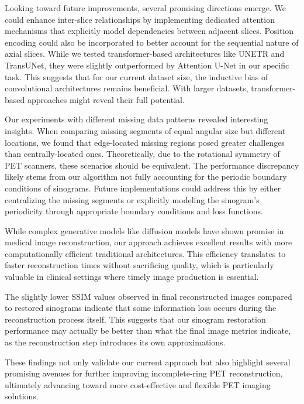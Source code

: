 \documentclass[
reprint,
superscriptaddress,
nofootinbib,
amsmath,amssymb,
aps,
prd,
]{revtex4-2}
\begin{document}
Looking toward future improvements, several promising directions emerge. We could enhance inter-slice relationships by implementing dedicated attention mechanisms that explicitly model dependencies between adjacent slices. Position encoding could also be incorporated to better account for the sequential nature of axial slices. While we tested transformer-based architectures like UNETR and TransUNet, they were slightly outperformed by Attention U-Net in our specific task. This suggests that for our current dataset size, the inductive bias of convolutional architectures remains beneficial. With larger datasets, transformer-based approaches might reveal their full potential.

Our experiments with different missing data patterns revealed interesting insights. When comparing missing segments of equal angular size but different locations, we found that edge-located missing regions posed greater challenges than centrally-located ones. Theoretically, due to the rotational symmetry of PET scanners, these scenarios should be equivalent. The performance discrepancy likely stems from our algorithm not fully accounting for the periodic boundary conditions of sinograms. Future implementations could address this by either centralizing the missing segments or explicitly modeling the sinogram's periodicity through appropriate boundary conditions and loss functions.

While complex generative models like diffusion models have shown promise in medical image reconstruction, our approach achieves excellent results with more computationally efficient traditional architectures. This efficiency translates to faster reconstruction times without sacrificing quality, which is particularly valuable in clinical settings where timely image production is essential.

The slightly lower SSIM values observed in final reconstructed images compared to restored sinograms indicate that some information loss occurs during the reconstruction process itself. This suggests that our sinogram restoration performance may actually be better than what the final image metrics indicate, as the reconstruction step introduces its own approximations.

These findings not only validate our current approach but also highlight several promising avenues for further improving incomplete-ring PET reconstruction, ultimately advancing toward more cost-effective and flexible PET imaging solutions.


\end{document}
